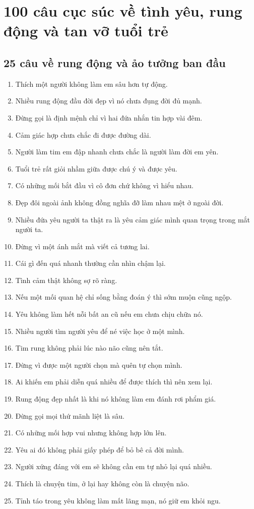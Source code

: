 \chapter{100 câu cục súc về tình yêu, rung động và tan vỡ tuổi trẻ}

\section{25 câu về rung động và ảo tưởng ban đầu}
\begin{enumerate}[leftmargin=*]
\item Thích một người không làm em sâu hơn tự động.
\item Nhiều rung động đầu đời đẹp vì nó chưa đụng đời đủ mạnh.
\item Đừng gọi là định mệnh chỉ vì hai đứa nhắn tin hợp vài đêm.
\item Cảm giác hợp chưa chắc đi được đường dài.
\item Người làm tim em đập nhanh chưa chắc là người làm đời em yên.
\item Tuổi trẻ rất giỏi nhầm giữa được chú ý và được yêu.
\item Có những mối bắt đầu vì cô đơn chứ không vì hiểu nhau.
\item Đẹp đôi ngoài ảnh không đồng nghĩa đỡ làm nhau mệt ở ngoài đời.
\item Nhiều đứa yêu người ta thật ra là yêu cảm giác mình quan trọng trong mắt người ta.
\item Đừng vì một ánh mắt mà viết cả tương lai.
\item Cái gì đến quá nhanh thường cần nhìn chậm lại.
\item Tình cảm thật không sợ rõ ràng.
\item Nếu một mối quan hệ chỉ sống bằng đoán ý thì sớm muộn cũng ngộp.
\item Yêu không làm hết nỗi bất an cũ nếu em chưa chịu chữa nó.
\item Nhiều người tìm người yêu để né việc học ở một mình.
\item Tim rung không phải lúc nào não cũng nên tắt.
\item Đừng vì được một người chọn mà quên tự chọn mình.
\item Ai khiến em phải diễn quá nhiều để được thích thì nên xem lại.
\item Rung động đẹp nhất là khi nó không làm em đánh rơi phẩm giá.
\item Đừng gọi mọi thứ mãnh liệt là sâu.
\item Có những mối hợp vui nhưng không hợp lớn lên.
\item Yêu ai đó không phải giấy phép để bỏ bê cả đời mình.
\item Người xứng đáng với em sẽ không cần em tự nhỏ lại quá nhiều.
\item Thích là chuyện tim, ở lại hay không còn là chuyện não.
\item Tỉnh táo trong yêu không làm mất lãng mạn, nó giữ em khỏi ngu.
\end{enumerate}

